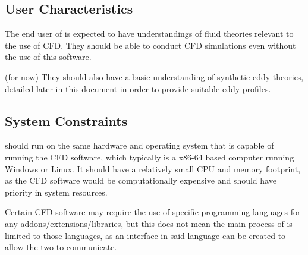 \documentclass[12pt]{article}
\begin{document}

\subsection{User Characteristics} \label{SecUserCharacteristics}

The end user of \progname{} is expected to have understandings of fluid theories relevant to the use of CFD. They should be able to conduct CFD simulations even without the use of this software. 

(for now) They should also have a basic understanding of synthetic eddy theories, detailed later in this document in order to provide suitable eddy profiles.


\subsection{System Constraints}

\progname{} should run on the same hardware and operating system that is capable of running the CFD software, which typically is a x86-64 based computer running Windows or Linux. It should have a relatively small CPU and memory footprint, as the CFD software would be computationally expensive and should have priority in system resources.

Certain CFD software may require the use of specific programming languages for any addons/extensions/libraries, but this does not mean the main process of \progname{} is limited to those languages, as an interface in said language can be created to allow the two to communicate.
\end{document}
